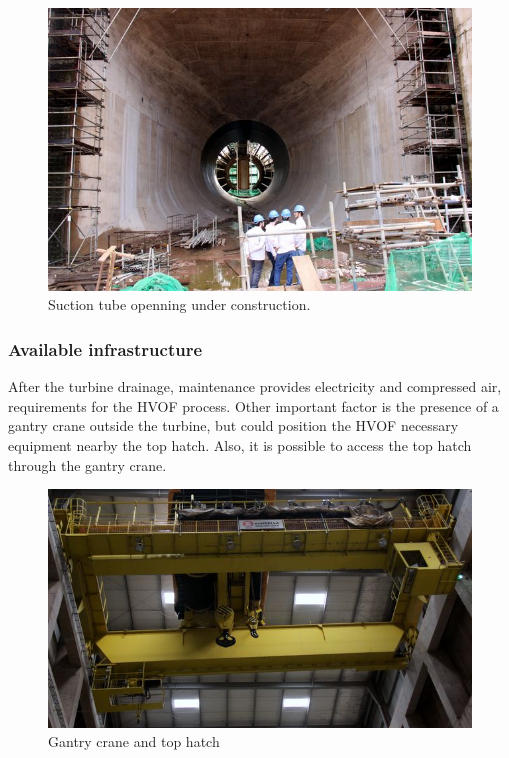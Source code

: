 \begin{figure}[H]	
	\includegraphics[width=\columnwidth]{figs/viagem/2015_04_30/Vao/img_5086}
	\caption{Suction tube openning under construction.}
	\label{fig::tubo_suc}
\end{figure}

\subsubsection{Available infrastructure}
After the turbine drainage, maintenance provides electricity and compressed
air, requirements for the HVOF process. Other important factor is the presence
of a gantry crane outside the turbine, but could position the HVOF necessary
equipment nearby the top hatch. Also, it is possible to access the top hatch
through the gantry crane.

\begin{figure}[h!]	
	\includegraphics[width=\columnwidth]{figs/viagem/2015_04_28/UG/img_4989}
	\caption{Gantry crane and top hatch}
	\label{fig::portico}
\end{figure}

